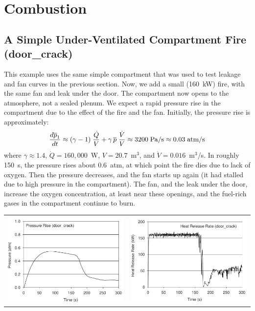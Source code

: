 \documentclass[11pt]{book}
\newcommand{\dQ}{\dot{Q}}
\newcommand{\be}{\begin{equation}}
\newcommand{\ee}{\end{equation}}
\begin{document}
\section{Combustion}


\subsection{A Simple Under-Ventilated Compartment Fire ({\bf door\_crack}) }
\label{door_crack}

This example uses the same simple compartment that was used to test leakage and fan curves in the previous section. Now, we add a small (160~kW) fire, with the same
fan and leak under the door. The compartment now opens to the atmosphere, not a sealed plenum. We expect a rapid pressure rise in the compartment due to the effect of the
fire and the fan. Initially, the pressure rise is approximately:
\be \frac{d \overline{p}_1}{dt} \approx (\gamma - 1) \; \frac{\dQ}{V} + \gamma \, \overline{p} \; \frac{ \dot{V} }{V} \approx 3200 \; \hbox{Pa/s}  \approx 0.03 \; \hbox{atm/s}   \ee
where $\gamma \approx 1.4$, $\dot{Q}=160,000$~W, $V=20.7$~m$^3$, and $\dot{V}=0.016$~m$^3$/s. In roughly 150~s, the pressure rises about 0.6~atm, at which point the fire
dies due to lack of oxygen. Then the pressure decreases, and the fan starts up again (it had stalled due to high pressure in the compartment). The fan, and the leak under the
door, increase the oxygen concentration, at least near these openings, and the fuel-rich gases in the compartment continue to burn.

\vspace{0.1in}
\noindent
\begin{tabular*}{\textwidth}{lr}
\includegraphics[width=3.1in]{FIGURES/door_crack_Pressure} &
\includegraphics[width=3.1in]{FIGURES/door_crack_HRR}
\end{tabular*}
\end{document}
